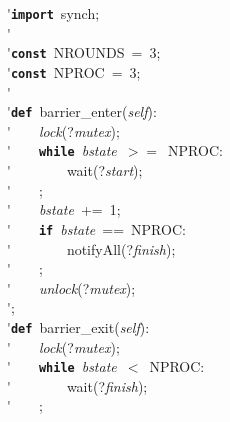 \'\>\texttt{\textbf{import}}~synch;\\

\'\>\\

\'\>\texttt{\textbf{const}}~NROUNDS~=~3;\\

\'\>\texttt{\textbf{const}}~NPROC~=~3;\\

\'\>\\

\'\>\texttt{\textbf{def}}~barrier\_enter(\textit{self}):\\

\'\>~~~~\textit{lock}(?\textit{mutex});\\

\'\>~~~~\texttt{\textbf{while}}~\textit{bstate}~$>=$~NPROC:\\

\'\>~~~~~~~~wait(?\textit{start});\\

\'\>~~~~;\\

\'\>~~~~\textit{bstate}~+=~1;\\

\'\>~~~~\texttt{\textbf{if}}~\textit{bstate}~==~NPROC:\\

\'\>~~~~~~~~notifyAll(?\textit{finish});\\

\'\>~~~~;\\

\'\>~~~~\textit{unlock}(?\textit{mutex});\\

\'\>;\\

\'\>\texttt{\textbf{def}}~barrier\_exit(\textit{self}):\\

\'\>~~~~\textit{lock}(?\textit{mutex});\\

\'\>~~~~\texttt{\textbf{while}}~\textit{bstate}~$<$~NPROC:\\

\'\>~~~~~~~~wait(?\textit{finish});\\

\'\>~~~~;\\

